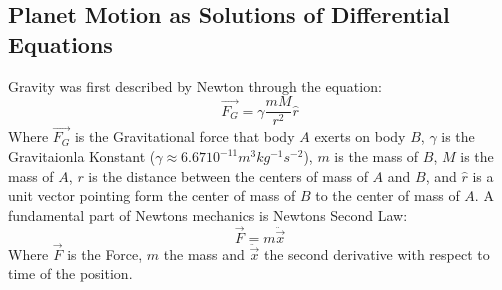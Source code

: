\documentclass[a4paper,onesided,10pt]{article}
\begin{document}
\subsection{Planet Motion as Solutions of Differential Equations}
Gravity was first described by Newton through the equation:
\begin{equation}
\vec{F_G} = \gamma \frac{mM}{r^2}\hat{r}
\label{eq:NewtonGravi}
\end{equation}
Where $\vec{F_G}$ is the Gravitational force that body $A$ exerts on body $B$, $\gamma$ is the Gravitaionla Konstant ($\gamma \approx  6.67 10^{-11} m^3 kg^{-1} s^{-2}$), $m$ is the mass of $B$, $M$ is the mass of $A$, $r$ is the distance between the centers of mass of $A$ and $B$, and $\hat{r}$ is a unit vector pointing form the center of mass of $B$ to the center of mass of $A$.
A fundamental part of Newtons mechanics is Newtons Second Law:
\begin{equation}
\vec{F} = m \ddot{\vec{x}}
\label{eq:NewtonsSecond}
\end{equation}
Where $\vec{F}$ is the Force, $m$ the mass and $\ddot{\vec{x}}$ the second derivative with respect to time of the position.
\end{document}
